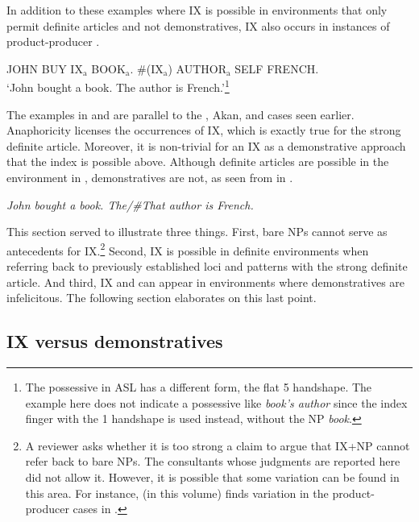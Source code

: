\documentclass[output=paper,
modfonts
]{langscibook}
\begin{document}
In addition to these examples where IX is possible in environments that only permit definite articles and not demonstratives, IX also occurs in instances of product-producer . 

\begin{exe}
\ex \label{ex:irani:23} JOHN BUY IX$_\text{a}$ BOOK$_\text{a}$. \#(IX$_\text{a}$) AUTHOR$_\text{a}$ SELF FRENCH.\\
`John bought a book. The author is French.'\footnote{The possessive in ASL has a different form, the flat 5 handshape. The example here does not indicate a possessive like \textit{book's author} since the index finger with the 1 handshape is used instead, without the NP \textit{book}.}
\end{exe}

The examples in  and  are parallel to the , Akan, and  cases seen earlier. Anaphoricity licenses the occurrences of IX, which is exactly true for the strong definite article. Moreover, it is non-trivial for an IX as a demonstrative approach that the index is possible above. Although definite articles are possible in the environment in , demonstratives are not, as seen from  in . 

\begin{exe}
\ex \label{ex:irani:24} \textit{John bought a book. The\textnormal{/}\textnormal{\#}That author is French.} 
\end{exe}

This section served to illustrate three things. First, bare NPs cannot serve as antecedents for IX.\footnote{A reviewer asks whether it is too strong a claim to argue that IX+NP cannot refer back to bare NPs. The consultants whose judgments are reported here did not allow it. However, it is possible that some variation can be found in this area. For instance, \citet{SereikaiteToAppear} (in this volume) finds variation in the product-producer  cases in .} Second, IX is possible in definite environments when referring back to previously established loci and patterns with the strong definite article. And third, IX and can appear in environments where demonstratives are infelicitous. The following section elaborates on this last point. 

\subsection{IX versus demonstratives}
\end{document}
